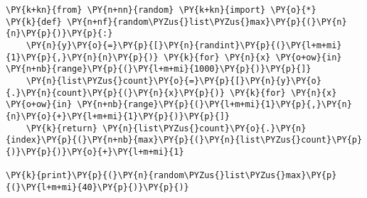 \begin{Verbatim}[commandchars=\\\{\}]
\PY{k+kn}{from} \PY{n+nn}{random} \PY{k+kn}{import} \PY{o}{*}
\PY{k}{def} \PY{n+nf}{random\PYZus{}list\PYZus{}max}\PY{p}{(}\PY{n}{n}\PY{p}{)}\PY{p}{:}
    \PY{n}{y}\PY{o}{=}\PY{p}{[}\PY{n}{randint}\PY{p}{(}\PY{l+m+mi}{1}\PY{p}{,}\PY{n}{n}\PY{p}{)} \PY{k}{for} \PY{n}{x} \PY{o+ow}{in} \PY{n+nb}{range}\PY{p}{(}\PY{l+m+mi}{1000}\PY{p}{)}\PY{p}{]}
    \PY{n}{list\PYZus{}count}\PY{o}{=}\PY{p}{[}\PY{n}{y}\PY{o}{.}\PY{n}{count}\PY{p}{(}\PY{n}{x}\PY{p}{)} \PY{k}{for} \PY{n}{x} \PY{o+ow}{in} \PY{n+nb}{range}\PY{p}{(}\PY{l+m+mi}{1}\PY{p}{,}\PY{n}{n}\PY{o}{+}\PY{l+m+mi}{1}\PY{p}{)}\PY{p}{]}
    \PY{k}{return} \PY{n}{list\PYZus{}count}\PY{o}{.}\PY{n}{index}\PY{p}{(}\PY{n+nb}{max}\PY{p}{(}\PY{n}{list\PYZus{}count}\PY{p}{)}\PY{p}{)}\PY{o}{+}\PY{l+m+mi}{1}

\PY{k}{print}\PY{p}{(}\PY{n}{random\PYZus{}list\PYZus{}max}\PY{p}{(}\PY{l+m+mi}{40}\PY{p}{)}\PY{p}{)}
\end{Verbatim}

